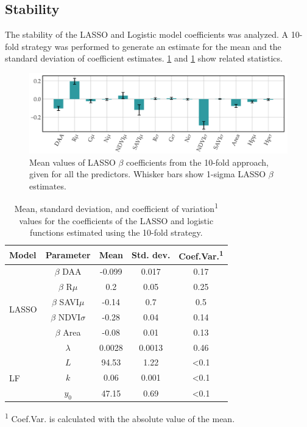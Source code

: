 \documentclass[12pt,a4paper,oneside]{report}
\begin{document}
\subsection{Stability}

The stability of the LASSO and Logistic model coefficients was analyzed. A 10-fold 
strategy was performed to generate an estimate for the mean and the standard deviation of coefficient estimates. 
\cref{fig:stability} and \cref{tab:LASSO} show related statistics.

\begin{figure}[H]
    \centering
    \includegraphics[width=\textwidth]{Images/agronomy-14-00306-g007}
    \caption{Mean values of LASSO $\beta$ coefficients from the 10-fold approach, given for all the predictors. Whisker bars show 1-sigma LASSO $\beta$ estimates.}
    \label{fig:stability}
\end{figure}

\begin{table}[H]
    \centering
    \caption{Mean, standard deviation, and coefficient of variation\textsuperscript{1} values for the coefficients of the LASSO and logistic functions estimated using the 10-fold strategy.}
    \begin{tabular}{lcccc}
    \toprule
    \textbf{Model} & \textbf{Parameter} & \textbf{Mean} & \textbf{Std. dev.} & \textbf{Coef.Var.\textsuperscript{1}} \\
    \midrule
    \multirow{6}{*}{LASSO} & $\beta$ DAA & -0.099 & 0.017 & 0.17 \\
    & $\beta$ R$\mu$ & 0.2 & 0.05 & 0.25 \\
    & $\beta$ SAVI$\mu$ & -0.14 & 0.7 & 0.5 \\
    & $\beta$ NDVI$\sigma$ & -0.28 & 0.04 & 0.14 \\
    & $\beta$ Area & -0.08 & 0.01 & 0.13 \\
    & $\lambda$ & 0.0028 & 0.0013 & 0.46 \\
    \midrule
    \multirow{3}{*}{LF} & $L$ & 94.53 & 1.22 & <0.1 \\
    & $k$ & 0.06 & 0.001 & <0.1 \\
    & $y_0$ & 47.15 & 0.69 & <0.1 \\
    \bottomrule
    \end{tabular}
    \label{tab:LASSO}
    \footnotesize{\textsuperscript{1} Coef.Var. is calculated with the absolute value of the mean.}
\end{table}
\end{document}

